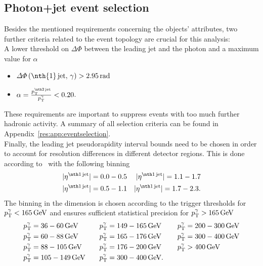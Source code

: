 \subsection{Photon+jet event selection}
Besides the mentioned requirements concerning the objects' attributes, two further criteria related to the event topology are crucial for this analysis:\\
A lower threshold on $\Delta \Phi$ between the leading jet and the photon and a maximum value for $\alpha$
\begin{itemize}
 \item $\Delta \Phi \left(\text{\nth{1}\,jet},\,\gamma \right) > 2.95\,\unit{rad}$
 \item $\alpha = \frac{\ptsecondjet}{\ptgamma} < 0.20$.
\end{itemize}
These requirements are important to suppress events with too much further hadronic activity.
A summary of all selection criteria can be found in Appendix~\ref{res:app:eventselection}.\\

Finally, the leading jet pseudorapidity interval bounds need to be chosen in order to account for resolution differences in different detector regions.
This is done according to~\cite{bib:Matthias_Thesis} with the following binning
\begin{align*}
|\etafirstjet| = 0.0-0.5 && |\etafirstjet| = 1.1-1.7 \\
|\etafirstjet| = 0.5-1.1 && |\etafirstjet| = 1.7-2.3.
\end{align*}
The binning in the \ptgamma dimension is chosen according to the trigger thresholds for \mbox{${p}_\mathrm{T}^{\gamma}<165\,\text{Ge}\kern-0.06667em\text{V}$} and ensures sufficient statistical precision for \mbox{${p}_\mathrm{T}^{\gamma}>165\,\text{Ge}\kern-0.06667em\text{V}$}
\begin{align*}
{p}_\mathrm{T}^{\gamma} &= 36 -60\,\text{Ge}\kern-0.06667em\text{V}     &  {p}_\mathrm{T}^{\gamma} &= 149-165\,\text{Ge}\kern-0.06667em\text{V}   & {p}_\mathrm{T}^{\gamma} &= 200-300\,\text{Ge}\kern-0.06667em\text{V}\\
{p}_\mathrm{T}^{\gamma} &= 60 -88\,\text{Ge}\kern-0.06667em\text{V}     &  {p}_\mathrm{T}^{\gamma} &= 165-176\,\text{Ge}\kern-0.06667em\text{V}  & {p}_\mathrm{T}^{\gamma} &= 300-400\,\text{Ge}\kern-0.06667em\text{V}\\
{p}_\mathrm{T}^{\gamma} &= 88 -105\,\text{Ge}\kern-0.06667em\text{V}    &  {p}_\mathrm{T}^{\gamma} &= 176-200\,\text{Ge}\kern-0.06667em\text{V}  & {p}_\mathrm{T}^{\gamma} &> 400\,\text{Ge}\kern-0.06667em\text{V}\\
{p}_\mathrm{T}^{\gamma} &= 105-149\,\text{Ge}\kern-0.06667em\text{V}   \quad &  {p}_\mathrm{T}^{\gamma}  &= 300-400\,\text{Ge}\kern-0.06667em\text{V}. \quad& \\
\end{align*}


\FloatBarrier
